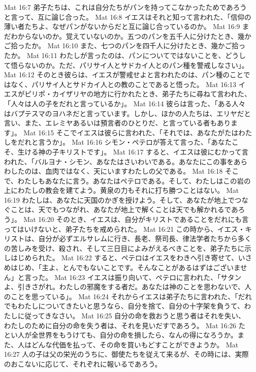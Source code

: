 Mat 16:7  弟子たちは、これは自分たちがパンを持ってこなかったためであろうと言って、互に論じ合った。
Mat 16:8  イエスはそれと知って言われた、「信仰の薄い者たちよ、なぜパンがないからだと互に論じ合っているのか。
Mat 16:9  まだわからないのか。覚えていないのか。五つのパンを五千人に分けたとき、幾かご拾ったか。
Mat 16:10  また、七つのパンを四千人に分けたとき、幾かご拾ったか。
Mat 16:11  わたしが言ったのは、パンについてではないことを、どうして悟らないのか。ただ、パリサイ人とサドカイ人とのパン種を警戒しなさい」。
Mat 16:12  そのとき彼らは、イエスが警戒せよと言われたのは、パン種のことではなく、パリサイ人とサドカイ人との教のことであると悟った。
Mat 16:13  イエスがピリポ・カイザリヤの地方に行かれたとき、弟子たちに尋ねて言われた、「人々は人の子をだれと言っているか」。
Mat 16:14  彼らは言った、「ある人々はバプテスマのヨハネだと言っています。しかし、ほかの人たちは、エリヤだと言い、また、エレミヤあるいは預言者のひとりだ、と言っている者もあります」。
Mat 16:15  そこでイエスは彼らに言われた、「それでは、あなたがたはわたしをだれと言うか」。
Mat 16:16  シモン・ペテロが答えて言った、「あなたこそ、生ける神の子キリストです」。
Mat 16:17  すると、イエスは彼にむかって言われた、「バルヨナ・シモン、あなたはさいわいである。あなたにこの事をあらわしたのは、血肉ではなく、天にいますわたしの父である。
Mat 16:18  そこで、わたしもあなたに言う。あなたはペテロである。そして、わたしはこの岩の上にわたしの教会を建てよう。黄泉の力もそれに打ち勝つことはない。
Mat 16:19  わたしは、あなたに天国のかぎを授けよう。そして、あなたが地上でつなぐことは、天でもつながれ、あなたが地上で解くことは天でも解かれるであろう」。
Mat 16:20  そのとき、イエスは、自分がキリストであることをだれにも言ってはいけないと、弟子たちを戒められた。
Mat 16:21  この時から、イエス・キリストは、自分が必ずエルサレムに行き、長老、祭司長、律法学者たちから多くの苦しみを受け、殺され、そして三日目によみがえるべきことを、弟子たちに示しはじめられた。
Mat 16:22  すると、ペテロはイエスをわきへ引き寄せて、いさめはじめ、「主よ、とんでもないことです。そんなことがあるはずはございません」と言った。
Mat 16:23  イエスは振り向いて、ペテロに言われた、「サタンよ、引きさがれ。わたしの邪魔をする者だ。あなたは神のことを思わないで、人のことを思っている」。
Mat 16:24  それからイエスは弟子たちに言われた、「だれでもわたしについてきたいと思うなら、自分を捨て、自分の十字架を負うて、わたしに従ってきなさい。
Mat 16:25  自分の命を救おうと思う者はそれを失い、わたしのために自分の命を失う者は、それを見いだすであろう。
Mat 16:26  たとい人が全世界をもうけても、自分の命を損したら、なんの得になろうか。また、人はどんな代価を払って、その命を買いもどすことができようか。
Mat 16:27  人の子は父の栄光のうちに、御使たちを従えて来るが、その時には、実際のおこないに応じて、それぞれに報いるであろう。
